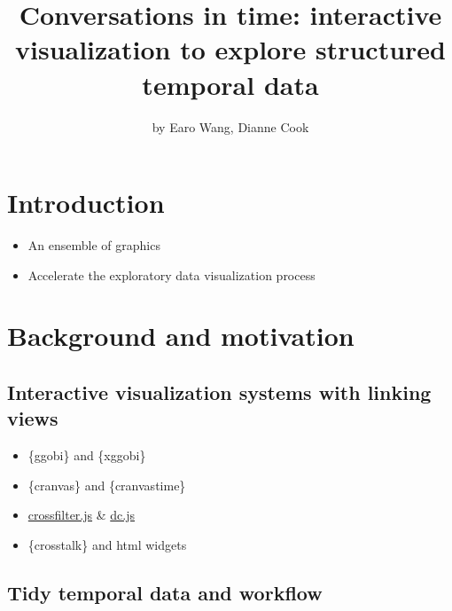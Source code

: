 \title{Conversations in time: interactive visualization to explore
structured temporal data}
\author{by Earo Wang, Dianne Cook}

\maketitle


\hypertarget{introduction}{%
\section{Introduction}\label{introduction}}

\begin{itemize}
\tightlist
\item
  An ensemble of graphics
\item
  Accelerate the exploratory data visualization process
\end{itemize}

\hypertarget{background-and-motivation}{%
\section{Background and motivation}\label{background-and-motivation}}

\hypertarget{interactive-visualization-systems-with-linking-views}{%
\subsection{Interactive visualization systems with linking
views}\label{interactive-visualization-systems-with-linking-views}}

\begin{itemize}
\tightlist
\item
  \{ggobi\} and \{xggobi\}
\item
  \{cranvas\} and \{cranvastime\}
\item
  \href{http://crossfilter.github.io/crossfilter/}{crossfilter.js} \&
  \href{https://dc-js.github.io/dc.js/}{dc.js}
\item
  \{crosstalk\} and html widgets
\end{itemize}

\hypertarget{tidy-temporal-data-and-workflow}{%
\subsection{Tidy temporal data and
workflow}\label{tidy-temporal-data-and-workflow}}

